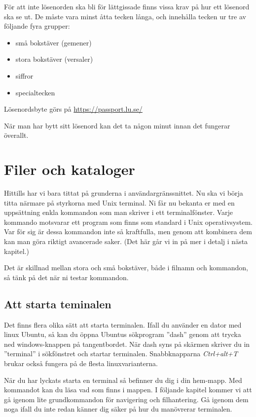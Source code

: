 \documentclass[a4paper,twocolumn]{book}
\begin{document}
För att inte lösenorden ska bli för lättgissade finns vissa
krav på hur ett lösenord ska se ut. De måste vara minst åtta tecken
långa, och innehålla tecken ur tre av följande fyra grupper:
\begin{itemize}
\item små bokstäver (gemener)
\item stora bokstäver (versaler)
\item siffror
\item specialtecken
\end{itemize}

Lösenordsbyte görs på
\url{https://passport.lu.se/}

När man har bytt sitt lösenord kan det ta någon minut innan det fungerar
överallt.

\section{Filer och kataloger}

Hittills har vi bara tittat på grunderna i användargränssnittet. Nu ska vi börja
titta närmare på styrkorna med Unix terminal. Ni får nu bekanta er med en uppsättning
enkla kommandon som man skriver i ett terminalfönster. Varje kommando motsvarar ett program som finns som standard i Unix operativsystem.
Var för sig är dessa kommandon inte så kraftfulla, men genom att kombinera dem kan man göra
riktigt avancerade saker. (Det här går vi in på mer i detalj i nästa kapitel.)

Det är skillnad mellan stora och små bokstäver, både i filnamn och kommandon, så
tänk på det när ni testar kommandon.

\subsection{Att starta teminalen}
Det finns flera olika sätt att starta terminalen. Ifall du använder en dator med linux Ubuntu, så kan du öppna Ubuntus sökprogram ''dash''
genom att trycka ned windows-knappen på tangentbordet. När dash syns på skärmen skriver du in ''terminal'' i sökfönstret och startar terminalen.
Snabbknapparna \emph{Ctrl+alt+T} brukar också fungera på de flesta linuxvarianterna.  

När du har lyckats starta en terminal så befinner du dig i din hem-mapp. Med kommandot   kan du läsa vad som finns i mappen. 
I följande kapitel kommer vi att gå igenom lite grundkommandon för navigering och filhantering. Gå igenom dem noga ifall du inte redan 
känner dig säker på hur du manövrerar terminalen.
\end{document}
